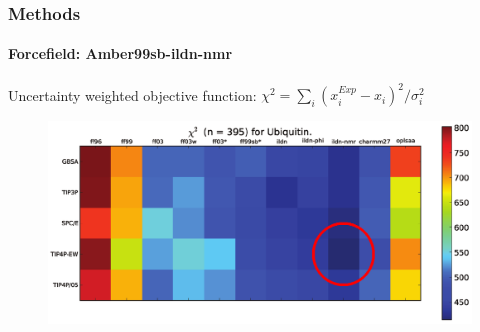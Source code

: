 \documentclass[english]{beamer}
\begin{document}

\begin{frame}
    \frametitle{Methods}
    \framesubtitle{Forcefield: Amber99sb-ildn-nmr}

    Uncertainty weighted objective function: $\chi^2 = \sum_i(x_i^{Exp} - x_i)^2 / \sigma_i^2$

    \begin{figure}
        \includegraphics[width=\linewidth]{figures/forcefield_performance.png}
    \end{figure}        

    \tiny

    

\end{frame}   

\end{document}
